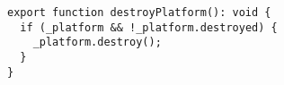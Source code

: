 \begin{verbatim}
export function destroyPlatform(): void {
  if (_platform && !_platform.destroyed) {
    _platform.destroy();
  }
}
\end{verbatim}
